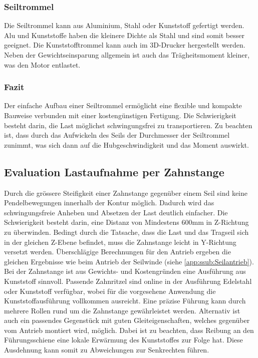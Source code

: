 \documentclass[a4paper]{report}
\begin{document}
\subsubsection{Seiltrommel}
\label{app:ssec:Seiltrommel}
Die Seiltrommel kann aus Aluminium, Stahl oder Kunststoff gefertigt werden. Alu und Kunststoffe haben die kleinere Dichte als Stahl und sind somit besser geeignet. Die Kunststofftrommel kann auch im 3D-Drucker hergestellt werden. Neben der Gewichtseinsparung allgemein ist auch das Trägheitsmoment kleiner, was den Motor entlastet.

\subsubsection{Fazit}
\label{app:ssec:Fazit}
Der einfache Aufbau einer Seiltrommel ermöglicht eine flexible und kompakte Bauweise verbunden mit einer kostengünstigen Fertigung. Die Schwierigkeit besteht darin, die Last möglichst schwingungsfrei zu transportieren. Zu beachten ist, dass durch das Aufwickeln des Seils der Durchmesser der Seiltrommel zunimmt, was sich dann auf die Hubgeschwindigkeit und das Moment auswirkt.

\subsection{Evaluation Lastaufnahme per Zahnstange}
\label{app:ssec:EvalLastZahn}
Durch die grössere Steifigkeit einer Zahnstange gegenüber einem Seil sind keine Pendelbewegungen innerhalb der Kontur möglich. Dadurch wird das schwingungsfreie Anheben und Absetzen der Last deutlich einfacher. Die Schwierigkeit besteht darin, eine Distanz von Mindestens 600mm in Z-Richtung zu überwinden. Bedingt durch die Tatsache, dass die Last und das Tragseil sich in der gleichen Z-Ebene befindet, muss die Zahnstange leicht in Y-Richtung versetzt werden. \newline
Überschlägige Berechnungen für den Antrieb ergeben die gleichen Ergebnisse wie beim Antrieb der Seilwinde (siehe \ref{app:ssub:Seilantrieb}). Bei der Zahnstange ist aus Gewichts- und Kostengründen eine Ausführung aus Kunststoff sinnvoll. Passende Zahnritzel sind online in der Ausführung Edelstahl oder Kunststoff verfügbar, wobei für die vorgesehene Anwendung die Kunststoffausführung vollkommen ausreicht. Eine präzise Führung kann durch mehrere Rollen rund um die Zahnstange gewährleistet werden. Alternativ ist auch ein passendes Gegenstück mit guten Gleiteigenschaften, welches gegenüber vom Antrieb montiert wird, möglich. Dabei ist zu beachten, dass Reibung an den Führungsschiene eine lokale Erwärmung des Kunststoffes zur Folge hat. Diese Ausdehnung kann somit zu Abweichungen zur Senkrechten führen.
\end{document}
